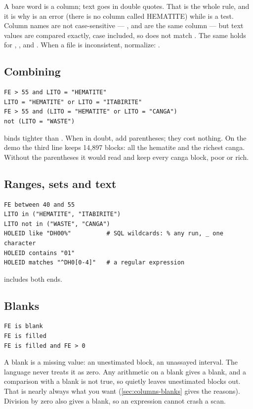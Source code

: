 A bare word is a column; text goes in double quotes. That is the whole rule, and it is why  is an error (there is no column called HEMATITE) while  is a test. Column names are not case-sensitive — ,  and  are the same column — but text values are compared exactly, case included, so  does not match . The same holds for , ,  and . When a file is inconsistent, normalize: .

\subsection{Combining}
\begin{lstlisting}[language=expr]
FE > 55 and LITO = "HEMATITE"
LITO = "HEMATITE" or LITO = "ITABIRITE"
FE > 55 and (LITO = "HEMATITE" or LITO = "CANGA")
not (LITO = "WASTE")
\end{lstlisting}

 binds tighter than . When in doubt, add parentheses; they cost nothing. On the demo the third line keeps 14,897 blocks: all the hematite and the richest canga. Without the parentheses it would read  and keep every canga block, poor or rich.

\subsection{Ranges, sets and text}
\begin{lstlisting}[language=expr]
FE between 40 and 55
LITO in ("HEMATITE", "ITABIRITE")
LITO not in ("WASTE", "CANGA")
HOLEID like "DH00%"          # SQL wildcards: % any run, _ one character
HOLEID contains "01"
HOLEID matches "^DH0[0-4]"   # a regular expression
\end{lstlisting}

 includes both ends.

\subsection{Blanks}
\begin{lstlisting}[language=expr]
FE is blank
FE is filled
FE is filled and FE > 0
\end{lstlisting}

A blank is a missing value: an unestimated block, an unassayed interval. The language never treats it as zero. Any arithmetic on a blank gives a blank, and a comparison with a blank is not true, so  quietly leaves unestimated blocks out. That is nearly always what you want (\cref{sec:columns-blanks} gives the reasons). Division by zero also gives a blank, so an expression cannot crash a scan.

